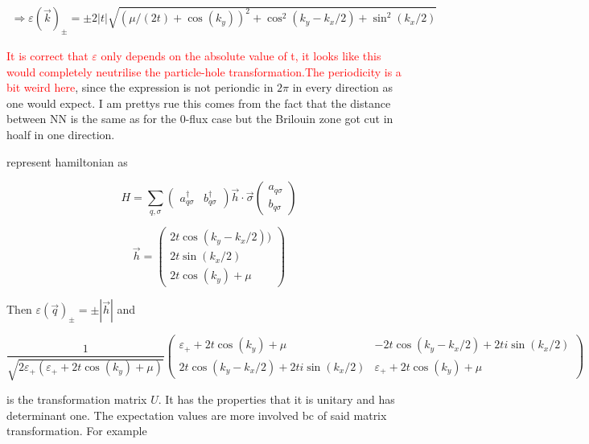 \documentclass[../../../main.tex]{subfiles}
\begin{document}
\begin{align}
	\Rightarrow \varepsilon(\vec{k})_{\pm} = \pm 2|t|\sqrt{( \mu/(2t) + \cos(k_y))^2 +\cos^2(k_y-k_x/2) + \sin^2(k_x/2)}
\end{align}

\textcolor{red}{It is correct that $\varepsilon$ only depends on the absolute value of t, it looks like this would completely neutrilise the particle-hole transformation.}\textcolor{red}{The periodicity is a bit weird here}, since the expression is not periondic in $2\pi$ in every direction as one would expect. I am prettys rue this comes from the fact that the distance between NN is the same as for the 0-flux case but the Brilouin zone got cut in hoalf in one direction. 

represent hamiltonian as 

\begin{equation}
	H = \sum_{q,\sigma}
\begin{pmatrix}
a_{q\sigma}^\dagger & b_{q\sigma}^\dagger 
\end{pmatrix}
\vec{h}\cdot\vec{\sigma}
\begin{pmatrix}
a_{q\sigma} \\
b_{q\sigma}
\end{pmatrix}
\end{equation}

\begin{equation}
\vec{h} = 
\begin{pmatrix}
2t\cos(k_y-k_x/2)) \\
2t\sin(k_x/2)\\
2t\cos(k_y) + \mu
\end{pmatrix}
\end{equation}

Then $\varepsilon(\vec{q})_{\pm} = \pm |\vec{h}|$ and 

\begin{equation}
\frac{1}{\sqrt{2\varepsilon_{+}(\varepsilon_+ + 2t\cos(k_y)+\mu)}}
\begin{pmatrix}
\varepsilon_+ + 2t\cos(k_y) + \mu &-2t\cos(k_y - k_x/2) + 2ti\sin(k_x/2) \\
2t\cos(k_y-k_x/2) + 2ti\sin(k_x/2) &\varepsilon_+ + 2t\cos(k_y) + \mu 
\end{pmatrix}
\end{equation}

is the transformation matrix $U$. It has the properties that it is unitary and has determinant one.  The expectation values are more involved bc of said matrix transformation. For example 
\end{document}
